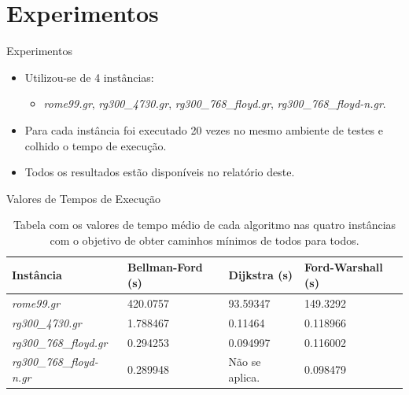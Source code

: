 \documentclass{beamer}
\begin{document}
\section{Experimentos}
	\begin{frame}{Experimentos}
		\begin{itemize}
			\item Utilizou-se de 4 instâncias:
			\begin{itemize}
				\item \textit{rome99.gr}, \textit{rg300\_4730.gr}, \textit{rg300\_768\_floyd.gr}, \textit{rg300\_768\_floyd-n.gr}.
			\end{itemize}
			
			\bigskip
			
			\item Para cada instância foi executado 20 vezes no mesmo ambiente de testes e colhido o tempo de execução.
			
			\bigskip
			
			\item Todos os resultados estão disponíveis no relatório deste.
		\end{itemize}
	\end{frame}
	
	\begin{frame}{Valores de Tempos de Execução}
		\begin{table}[H]
			\centering
			\caption{Tabela com os valores de tempo médio de cada algoritmo nas quatro instâncias com o objetivo de obter caminhos mínimos de todos para todos.}
			{\footnotesize 
			
			\begin{tabular}{l|lll}
				\hline
				\textbf{Instância} & \textbf{Bellman-Ford (s)} & \textbf{Dijkstra (s)} & \textbf{Ford-Warshall (s)} \\ \hline \hline
				\textit{ rome99.gr}         & 420.0757                           & 93.59347                          & 149.3292                            \\
				\textit{ rg300\_4730.gr}         & 1.788467                           & 0.11464                          & 0.118966                            \\
				\textit{ rg300\_768\_floyd.gr}         & 0.294253                           & 0.094997                          & 0.116002                            \\
				\textit{ rg300\_768\_floyd-n.gr}    & 0.289948  & Não se aplica.                              & 0.098479                            \\ \hline
			\end{tabular}	
			}
		\end{table}
	\end{frame}
	
\end{document}
